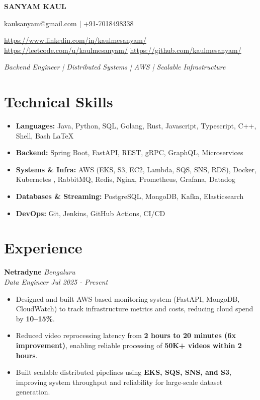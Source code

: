 \documentclass[10pt,a4paper]{article}
\newcommand{\resumeItem}[1]{\item\small{#1}}
\begin{document}
\begin{center}
    {\Huge\bfseries SANYAM KAUL} \\ \vspace{2pt}
    
    \small kaulsanyam@gmail.com \quad | \quad +91-7018498338 \\ \vspace{2pt}
    
    \small
    \href{https://www.linkedin.com/in/kaulmesanyam/}{https://www.linkedin.com/in/kaulmesanyam/} \quad
    \href{https://leetcode.com/u/kaulmesanyam/}{https://leetcode.com/u/kaulmesanyam/} \quad
    \href{https://github.com/kaulmesanyam/}{https://github.com/kaulmesanyam/} \\ \vspace{2pt}
    
    \textit{Backend Engineer | Distributed Systems | AWS | Scalable Infrastructure}
\end{center}

\vspace{4pt}

\section{Technical Skills}
\begin{itemize}[leftmargin=*,noitemsep]
    \resumeItem{\textbf{Languages:} Java, Python, SQL, Golang, Rust, Javascript, Typescript, C++, Shell, Bash LaTeX}
    \resumeItem{\textbf{Backend:} Spring Boot, FastAPI, REST, gRPC, GraphQL, Microservices}
    \resumeItem{\textbf{Systems \& Infra:} AWS (EKS, S3, EC2, Lambda, SQS, SNS, RDS), Docker, Kubernetes , RabbitMQ, Redis, Nginx, Prometheus, Grafana, Datadog}
    \resumeItem{\textbf{Databases \& Streaming:} PostgreSQL, MongoDB, Kafka, Elasticsearch}
    \resumeItem{\textbf{DevOps:} Git, Jenkins, GitHub Actions, CI/CD}
\end{itemize}

\vspace{4pt}

\section{Experience}

\textbf{Netradyne} \hfill \textit{Bengaluru} \\
\textit{Data Engineer} \hfill \textit{Jul 2025 - Present}
\begin{itemize}[leftmargin=*,noitemsep]
    \resumeItem{Designed and built AWS-based monitoring system (FastAPI, MongoDB, CloudWatch) to track infrastructure metrics and costs, reducing cloud spend by \textbf{10--15\%}.}
    \resumeItem{Reduced video reprocessing latency from \textbf{2 hours to 20 minutes (6x improvement)}, enabling reliable processing of \textbf{50K+ videos within 2 hours}.}
    \resumeItem{Built scalable distributed pipelines using \textbf{EKS, SQS, SNS, and S3}, improving system throughput and reliability for large-scale dataset generation.}
\end{itemize}
\end{document}
